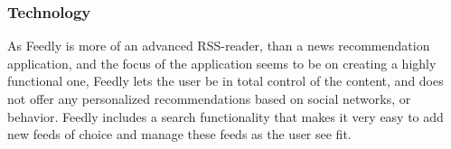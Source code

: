 \subsubsection{Technology}
As Feedly is more of an advanced RSS-reader, than a news recommendation application, and the focus of the application seems to be on creating a highly functional one, Feedly lets the user be in total control of the content, and does not offer any personalized recommendations based on social networks, or behavior. Feedly includes a search functionality that makes it very easy to add new feeds of choice and manage these feeds as the user see fit.

